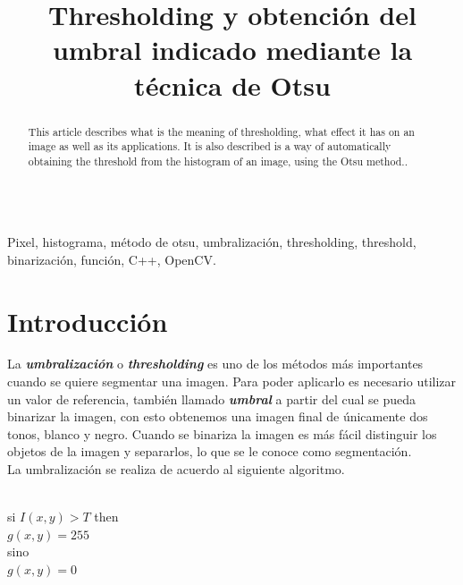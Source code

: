 \documentclass[conference]{IEEEtran}
\begin{document}
\title{ Thresholding y obtenci\'on del umbral indicado mediante la t\'ecnica de Otsu }
\author{
}

\maketitle
\renewcommand\abstractname{Abstract}
\begin{abstract}
This article describes what is the meaning of thresholding, what effect it has on an image as well as its applications. It is also described is a way of automatically obtaining the threshold from the histogram of an image, using the Otsu method.. \\\\
\end{abstract}

\begin{IEEEkeywords}
Pixel, histograma, m\'etodo de otsu, umbralizaci\'on, thresholding, threshold, binarizaci\'on, funci\'on, C++, OpenCV.
\end{IEEEkeywords}

\IEEEpeerreviewmaketitle
\section{Introducci\'on}
La \textbf{\emph{umbralizaci\'on}}  o \textbf{\emph{thresholding}} es uno de los m\'etodos m\'as importantes cuando se quiere segmentar una imagen. Para poder aplicarlo es necesario utilizar un valor de referencia, tambi\'en llamado \textbf{\emph{umbral}} a partir del cual se pueda binarizar la imagen, con esto obtenemos una imagen final de \'unicamente dos tonos, blanco y negro. Cuando se binariza la imagen es m\'as f\'acil distinguir los objetos de la imagen y separarlos, lo que se le conoce como segmentaci\'on. \\
La umbralizaci\'on se realiza de acuerdo al siguiente algoritmo.\\\\

\begin{center}
si $I(x,y) > T$  then\\
$g(x,y) = 255$\\
sino\\
$g(x,y) = 0$\\
\end{center}
\end{document}
